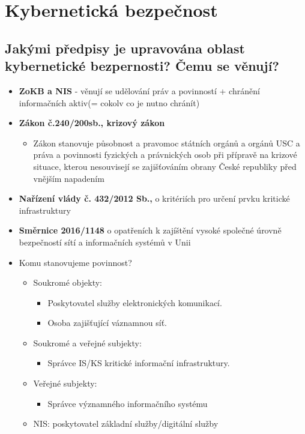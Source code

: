 \section{Kybernetická bezpečnost}

\subsection{Jakými předpisy je upravována oblast kybernetické bezpernosti? Čemu se věnují?}
\begin{itemize}

    \item \textbf{ZoKB a NIS} - věnují se udělování práv a povinností + chránění informačních aktiv(= cokolv co je nutno chránít)
    \item \textbf{Zákon č.240/200sb., krizový zákon}
          \begin{itemize}
              \item Zákon stanovuje působnost a pravomoc státních orgánů a orgánů USC a práva a povinnosti fyzických a právnických osob při přípravě na krizové situace, kterou nesouvisejí se zajišťováním obrany České republiky před vnějším napadením
          \end{itemize}
    \item \textbf{Nařízení vlády č. 432/2012 Sb.,} o kritériích pro určení prvku kritické infrastruktury
    \item \textbf{Směrnice 2016/1148} o opatřeních k zajíštění vysoké společné úrovně bezpečností sítí a informačních systémů v Unii
    \item Komu stanovujeme povinnost?
          \begin{itemize}
              \item Soukromé objekty:
                    \begin{itemize}
                        \item Poskytovatel služby elektronických komunikací.
                        \item Osoba zajišťující váznamnou síť.
                    \end{itemize}
              \item Soukromé a veřejné subjekty:
                    \begin{itemize}
                        \item Správce IS/KS kritické informační infrastruktury.
                    \end{itemize}
              \item Veřejné subjekty:
                    \begin{itemize}
                        \item Správce významného informačního systému
                    \end{itemize}
              \item NIS: poskytovatel základní služby/digitální služby
          \end{itemize}
\end{itemize}


